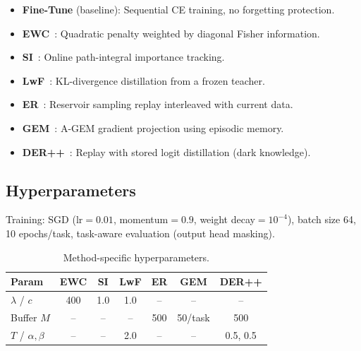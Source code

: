 \documentclass[10pt, a4paper, twocolumn]{article}
\begin{document}
\begin{itemize}[leftmargin=1.2em, itemsep=1pt, topsep=2pt]
  \item \textbf{Fine-Tune} (baseline): Sequential CE training, no forgetting protection.
  \item \textbf{EWC}~\cite{kirkpatrick2017overcoming}: Quadratic penalty weighted by diagonal Fisher information.
  \item \textbf{SI}~\cite{zenke2017continual}: Online path-integral importance tracking.
  \item \textbf{LwF}~\cite{li2016learning}: KL-divergence distillation from a frozen teacher.
  \item \textbf{ER}~\cite{chaudhry2019continual}: Reservoir sampling replay interleaved with current data.
  \item \textbf{GEM}~\cite{lopez2017gradient}: A-GEM gradient projection using episodic memory.
  \item \textbf{DER++}~\cite{buzzega2020dark}: Replay with stored logit distillation (dark knowledge).
\end{itemize}

\subsection{Hyperparameters}

Training: SGD (lr$=0.01$, momentum$=0.9$, weight decay$=10^{-4}$), batch size 64, 10 epochs/task, task-aware evaluation (output head masking).

\vspace{2pt}
\begin{table}[h]
\centering
\caption{Method-specific hyperparameters.}
\vspace{2pt}
\small
\begin{tabular}{lcccccc}
\toprule
\textbf{Param} & \textbf{EWC} & \textbf{SI} & \textbf{LwF} & \textbf{ER} & \textbf{GEM} & \textbf{DER++} \\
\midrule
$\lambda$ / $c$ & 400  & 1.0  & 1.0  & --  & --  & -- \\
Buffer $M$      & --   & --   & --   & 500 & 50/task & 500 \\
$T$ / $\alpha,\beta$ & --  & --  & 2.0  & --  & --  & 0.5, 0.5 \\
\bottomrule
\end{tabular}
\label{tab:hyperparams}
\end{table}

\end{document}

